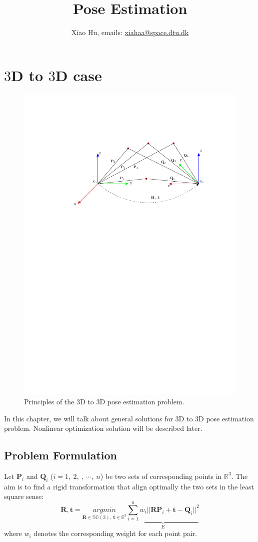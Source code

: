 \documentclass[a4paper]{report}
\begin{document}
\title{Pose Estimation}
\author{Xiao Hu, emails: \url{xiahaa@space.dtu.dk}}
\maketitle
\tableofcontents
\chapter{$3$D to $3$D case}
\begin{figure}
	\centering
	\includegraphics[scale=0.8]{hand_eye_files/vision/figures/p3.pdf}
	\caption{Principles of the $3$D to $3$D pose estimation problem.}
\end{figure}
In this chapter, we will talk about general solutions for 3D to 3D pose estimation problem. Nonlinear optimization solution will be described later.

\section{Problem Formulation}
Let $\mathbf{P}_i$ and $\mathbf{Q}_i$ ($i=1,\ 2,\ ,\ \cdots,\ n$) be two sets of corresponding points in $\mathbb{R}^{3}$. The aim is to find a rigid transformation that align optimally the two sets in the least square sense:
$$
\mathbf{R,t}=\underset{\mathbf{R}\in \mathbb{SO}(3),\ \mathbf{t} \in \mathbb{R}^3}{argmin} \underbrace{\sum_{i=1}^{n} w_i||\mathbf{RP}_i+\mathbf{t}-\mathbf{Q}_i||^2}_{E}
$$
where $w_i$ denotes the corresponding weight for each point pair. 
\end{document}
